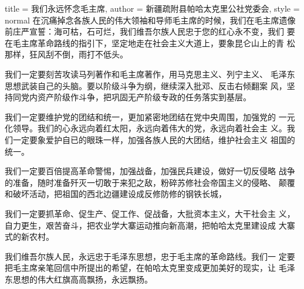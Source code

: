 \begin{hongqiarticle}{
        title  = {我们永远怀念毛主席},
        author = {新疆疏附县帕哈太克里公社党委会},
        style  = normal
    }
    在沉痛掉念各族人民的伟大领袖和导师毛主席的时候，我们在毛主席遗像
    前庄严宣誓：海可枯，石可烂，我们维吾尔族人民忠于您的红心永不变，我们
    要在毛主席革命路线的指引下，坚定地走在社会主义大道上，要象昆仑山上的青
    松那样，狂风刮不倒，雨打不低头。

    我们一定要刻苦攻读马列著作和毛主席著作，用马克思主义、列宁主义、
    毛泽东思想武装自己的头脑。要以阶级斗争为纲，继续深入批邓、反击右倾翻案
    风，坚持同党内资产阶级作斗争，把巩固无产阶级专政的任务落实到基层。

    我们一定要维护党的团结和统一，更加紧密地团结在党中央周围，加强党的
    一元化领导。我们的心永远向着红太阳，永远向着伟大的党，永远向着社会主
    义。我们一定要象爱护自已的眼珠一样，加强各族人民的大团结，维护社会主义
    祖国的统一。

    我们一定要百倍提高革命警惕，加强战备，加强民兵建设，做好一切反侵略
    战争的准备，随时准备歼灭一切敢于来犯之敌，粉碎苏修社会帝国主义的侵略、
    颠覆和破坏活动，把祖国的西北边疆建设成反修防修的钢铁长城，

    我们一定要抓革命、促生产、促工作、促战备，大批资本主义，大干社会主
    义，自力更生，艰苦奋斗，把农业学大寨运动推向新高潮，把帕哈太克里建设成
    大寨式的新农村。

    我们维吾尔族人民，永远忠于毛泽东思想，忠于毛主席的革命路线。我们一
    定要把毛主席亲笔回信中所提出的希望，在帕哈太克里变成更加美好的现实，让
    毛泽东思想的伟大红旗高高飘扬，永远飘扬。
\end{hongqiarticle}